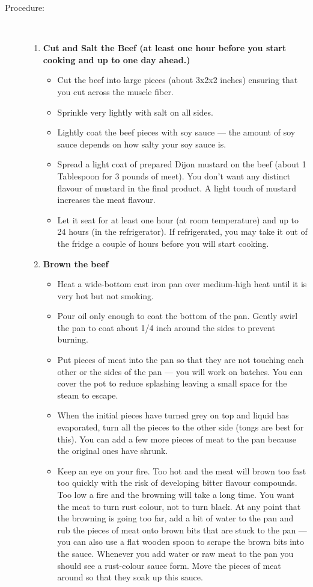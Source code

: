 \documentclass[11pt,letterpaper]{article}
\begin{document}
\begin{description}
\item[Procedure:]\ \\
	\begin{enumerate}
	\item {\bf Cut and Salt the Beef (at least one hour before you start cooking and up to one day ahead.)}
	\begin{itemize}
	\item  Cut the beef into large pieces (about 3x2x2 inches) ensuring that you cut across the muscle fiber.
	\item Sprinkle very lightly with salt on all sides.
	\item Lightly coat the beef pieces with soy sauce --- the amount of soy sauce depends on how salty your soy sauce is.
	\item Spread a light coat of prepared Dijon mustard on the beef (about 1 Tablespoon for 3 pounds of meet). You don't want any distinct flavour of mustard in the final product. A light touch of mustard increases the meat flavour.
	\item Let it seat for at least one hour (at room temperature) and up to 24 hours (in the refrigerator). If refrigerated, you may take it out of the fridge a couple of hours before you will start cooking.
	\end{itemize}
	\item {\bf Brown the beef}
	\begin{itemize}
	\item Heat a wide-bottom cast iron pan over medium-high heat until it is very hot but not smoking.
	 \item Pour oil only enough to coat the bottom of the pan. Gently swirl the pan to coat about 1/4 inch around the sides to prevent burning.
	 \item Put pieces of meat into the pan so that they are not touching each other or the sides of the pan --- you will work on batches. You can cover the pot to reduce splashing leaving a small space for the steam to escape. 
	  \item When the initial pieces have turned grey on top and liquid has evaporated, turn all the pieces to the other side (tongs are best for this). You can add a few more pieces of meat to the pan because the original ones have shrunk.
	 \item Keep an eye on your fire. Too hot and the meat will brown too fast too quickly with the risk of developing bitter flavour compounds. Too low a fire and the browning will take a long time. You want the meat to turn rust colour, not to turn black. At any point that the browning is going too far, add a bit of water to the pan and rub the pieces of meat onto brown bits that are stuck to the pan --- you can also use a flat wooden spoon to scrape the brown bits into the sauce. Whenever you add water or raw meat to the pan you should see a rust-colour sauce form. Move the pieces of meat around so that they soak up this sauce.

\end{itemize}
\end{enumerate}
\end{description}
\end{document}
